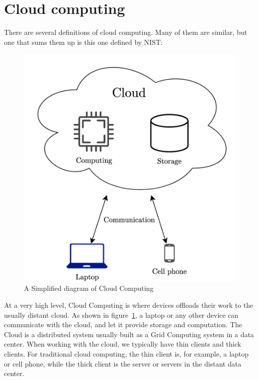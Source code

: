 



\section{Cloud computing}
There are several definitions of cloud computing. Many of them are similar, but one that sums them up is this one defined by NIST\cite{mell_nist_nodate}:


\begin{figure}[t]
    \centering
    \includegraphics[scale=0.7]{chapters/2_background/figures/Simplified_cloud.png}
    \caption{A Simplified diagram of Cloud Computing}
    \label{fig:SimplifiedCloudDiagram}
\end{figure}

At a very high level, Cloud Computing is where devices offloads their work to the usually distant cloud. As shown in figure~\ref{fig:SimplifiedCloudDiagram}, a laptop or any other device can communicate with the cloud, and let it provide storage and computation. The Cloud is a distributed system usually built as a Grid Computing system in a data center. When working with the cloud, we typically have thin clients and thick clients. For traditional cloud computing, the thin client is, for example, a laptop or cell phone, while the thick client is the server or servers in the distant data center. 


